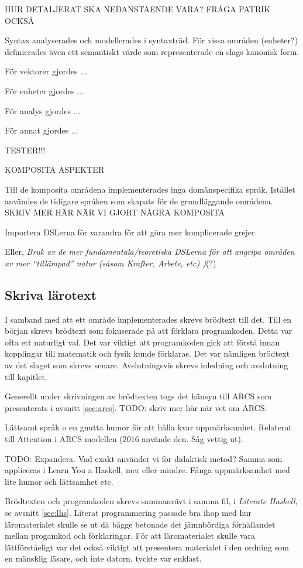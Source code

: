 \begin{binge}
HUR DETALJERAT SKA NEDANSTÅENDE VARA? FRÅGA PATRIK OCKSÅ

Syntax analyserades och modellerades i syntaxträd. För vissa områden
(enheter?) definierades även ett semantiskt värde som representerade
en slags kanonisk form.

För vektorer gjordes ...

För enheter gjordes ...

För analys gjordes ...

För annat gjordes ...


TESTER!!!

KOMPOSITA ASPEKTER

Till de komposita områdena implementerades inga domänspecifika språk. Istället användes de tidigare språken som skapats för de grundläggande områdena. SKRIV MER HÄR NÄR VI GJORT NÅGRA KOMPOSITA

Importera DSLerna för varandra för att göra mer komplicerade grejer.

Eller, \emph{Bruk av de mer fundamentala/teoretiska DSLerna för att
  angripa områden av mer ``tillämpad'' natur (såsom Krafter, Arbete,
  etc) )}(?)

\subsection{Skriva lärotext}

I samband med att ett område implementerades skrevs brödtext till det. Till en början skrevs brödtext som fokuserade på att förklara programkoden. Detta var ofta ett naturligt val. Det var viktigt att programkoden gick att förstå innan kopplingar till matematik och fysik kunde förklaras. Det var nämligen brödtext av det slaget som skrevs senare. Avslutningsvis skrevs inledning och avslutning till kapitlet.

Generellt under skrivningen av brödtexten togs det hänsyn till ARCS som presenterats i avsnitt \ref{sec:arcs}. TODO: skriv mer här när vet om ARCS.

Lättsamt språk o en gnutta humor för att hålla kvar
uppmärksamhet. Relaterat till Attention i ARCS modellen (2016
använde den. Såg vettig ut).

TODO: Expandera. Vad exakt använder vi för didaktisk metod? Samma
som appliceras i Learn You a Haskell, mer eller mindre. Fånga
uppmärksamhet med lite humor och lättsamhet etc.

Brödtexten och programkoden skrevs sammanvävt i samma fil, i \textit{Literate Haskell}, se avsnitt \ref{sec:lhs}. Literat programmering passade bra ihop med hur läromaterialet skulle se ut då bägge betonade det jämnbördiga förhållandet mellan progamkod och förklaringar. För att läromaterialet skulle vara lättförståeligt var det också viktigt att presentera materialet i den ordning som en mänsklig läsare, och inte datorn, tyckte var enklast.


\end{binge}

